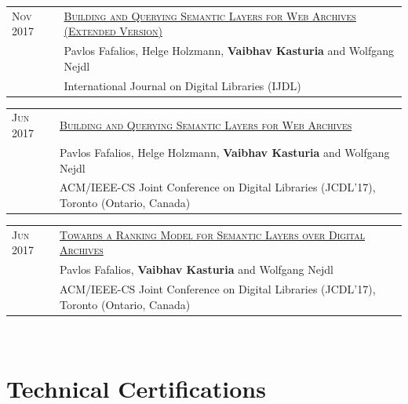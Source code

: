 \documentclass[a4paper,10pt]{article} %
\begin{document}
\begin{tabular}{ll}
\textsc{Nov 2017} & \href{https://arxiv.org/abs/1810.10455}{\textsc{Building and Querying Semantic Layers for Web Archives (Extended Version)}}\\
& Pavlos Fafalios, Helge Holzmann, \textbf{Vaibhav Kasturia} and Wolfgang Nejdl\\
& International Journal on Digital Libraries (IJDL)\\
\end{tabular}

\begin{tabular}{ll}

\textsc{Jun 2017} & \href{http://ieeexplore.ieee.org/document/7991555/}{\textsc{Building and Querying Semantic Layers for Web Archives}}\\
& Pavlos Fafalios, Helge Holzmann, \textbf{Vaibhav Kasturia} and Wolfgang Nejdl\\
& ACM/IEEE-CS Joint Conference on Digital Libraries (JCDL’17), Toronto (Ontario, Canada)\\
\end{tabular}

\begin{tabular}{ll}
\textsc{Jun 2017} & \href{http://ieeexplore.ieee.org/document/7991617/}{\textsc{Towards a Ranking Model for Semantic Layers over 
Digital Archives}}\\
& Pavlos Fafalios, \textbf{Vaibhav Kasturia} and Wolfgang Nejdl\\
& ACM/IEEE-CS Joint Conference on Digital Libraries (JCDL’17), Toronto (Ontario, Canada)\\
\end{tabular}
\\

\section{Technical Certifications}
\end{document}
